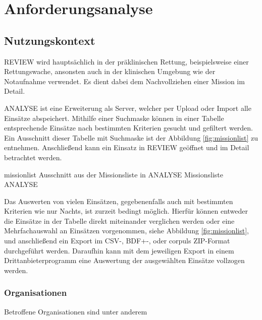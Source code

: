 \chapter{Anforderungsanalyse}
\label{kap:anforderungsanalyse}
\minitoc\pagebreak

\section{Nutzungskontext}
\label{sec:kontext}

\gls{REVIEW} wird hauptsächlich in der präklinischen Rettung, beispielsweise einer Rettungswache, ansonsten auch in der klinischen Umgebung wie der Notaufnahme verwendet.
Es dient dabei dem Nachvollziehen einer Mission im Detail.

\gls{ANALYSE} ist eine Erweiterung als Server, welcher per Upload oder Import alle Einsätze abspeichert. 
Mithilfe einer Suchmaske können in einer Tabelle entsprechende Einsätze nach bestimmten Kriterien gesucht und gefiltert werden.
Ein Ausschnitt dieser Tabelle mit Suchmaske ist der Abbildung \ref{fig:missionlist} zu entnehmen.
Anschließend kann ein Einsatz in \gls{REVIEW} geöffnet und im Detail betrachtet werden.

\bildbreit
{missionlist}
{Ausschnitt aus der \glqq Missionsliste\grqq{} in \gls{ANALYSE}}
{Missionsliste \gls{ANALYSE}}

Das Auswerten von vielen Einsätzen, gegebenenfalls auch mit bestimmten Kriterien wie \glqq nur Nachts\grqq, ist zurzeit bedingt möglich.
Hierfür können entweder die Einsätze in der Tabelle direkt miteinander verglichen werden oder eine Mehrfachauswahl an Einsätzen vorgenommen, siehe Abbildung \ref{fig:missionlist}, und anschließend ein Export im CSV-, BDF+-, oder \glqq corpuls ZIP\grqq -Format durchgeführt werden.
Daraufhin kann mit dem jeweiligen Export in einem Drittanbieterprogramm eine Auswertung der ausgewählten Einsätze vollzogen werden.

\subsection{Organisationen}
Betroffene Organisationen sind unter anderem 

